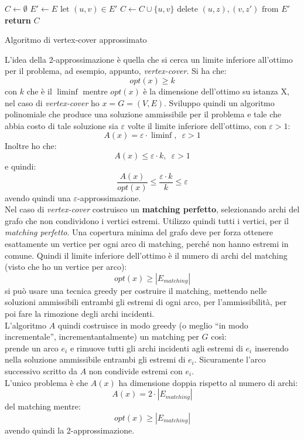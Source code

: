 \begin{algorithm}
  \begin{algorithmic}
    \State $C\gets\emptyset$
    \State $E'\gets E$
    \State $\mbox{let }(u,v)\in E'$
    \State $C\gets C\cup \{u,v\}$
    \State $\mbox{delete } (u,z),(v,z') \mbox{ from } E'$
    \EndFor
    \EndWhile
    \State \textbf{return} $C$
    \EndFunction
  \end{algorithmic}
  \caption{Algoritmo di vertex-cover approssimato}
\end{algorithm}
\newpage
L'idea della 2-approssimazione è quella che si cerca un limite inferiore
all'ottimo per il problema, ad esempio, appunto, \textit{vertex-cover}. Si ha
che:
\[opt(x)\geq k\]
con $k$ che è il $\liminf$ mentre $opt(x)$ è la dimensione dell'ottimo su
istanza X, nel caso di \textit{vertex-cover} ho $x=G=(V,E)$. Sviluppo quindi un
algoritmo polinomiale che produce una soluzione ammissibile per il problema e
tale che abbia costo di tale soluzione sia $\varepsilon$ volte il limite
inferiore dell'ottimo, con $\varepsilon>1$:
\[A(x)=\varepsilon\cdot \liminf,\,\,\,\varepsilon>1\]
Inoltre ho che:
\[A(x)\leq \varepsilon\cdot k,\,\,\,\varepsilon>1\]
e quindi:
\[\frac{A(x)}{opt(x)}\leq\frac{\varepsilon\cdot k}{k}\leq \varepsilon\]
avendo quindi una $\varepsilon$-approssimazione.\\
Nel caso di \textit{vertex-cover} costruisco un \textbf{matching perfetto},
selezionando archi del grafo che non condividono i vertici estremi. Utilizzo
quindi tutti i vertici, per il \textit{matching perfetto}. Una copertura minima
del grafo deve per forza ottenere esattamente un vertice per ogni arco di
matching, perché non hanno estremi in comune. Quindi il limite inferiore
dell'ottimo è il numero di archi del matching (visto che ho un vertice per
arco):
\[opt(x)\geq |E_{matching}|\]
si può usare una tecnica greedy per costruire il matching, mettendo nelle
soluzioni ammissibili entrambi gli estremi di ogni arco, per l'ammissibilità,
per poi fare la rimozione degli archi incidenti.\\
L'algoritmo $A$ quindi costruisce in modo greedy (o meglio ``in modo
incrementale'', incrementantalmente) un matching per $G$ così:
\\
prende un arco $e_i$ e rimuove tutti gli archi incidenti agli estremi
di $e_i$ inserendo nella soluzione ammissibile entrambi gli estremi di
$e_i$. Sicuramente l'arco successivo scritto da $A$ non condivide estremi con
$e_i$.\\
L'unico problema è che $A(x)$ ha dimensione doppia rispetto al numero di archi:
\[A(x)=2\cdot |E_{matching}|\]
del matching mentre:
\[opt(x)\geq |E_{matching}|\]
avendo quindi la 2-approssimazione.\\
